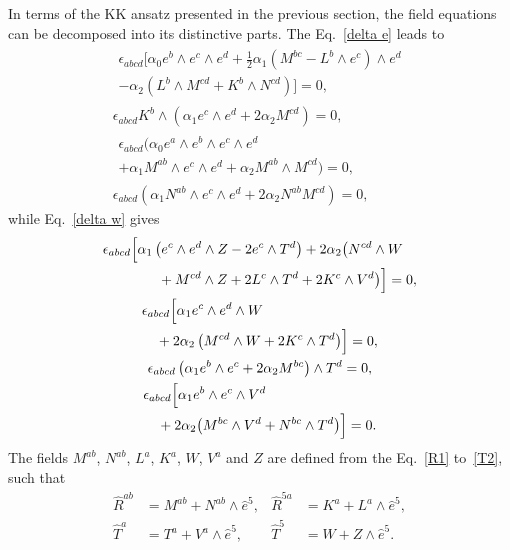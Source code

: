 \documentclass[aps,prd,12pt,superscriptaddress,showpacs,showkeys,longbibliography,reprint,nofootinbib]{revtex4-1}
\begin{document}
In terms of the KK ansatz presented in the previous section, the field equations can be decomposed into its distinctive parts. The Eq.~\eqref{delta e} leads to 
\setlength\multlinegap{0pt}
\begin{gather}
  \begin{multlined}
    \label{equation}
    \epsilon_{abcd}\Big[\alpha_0 e^b\wedge e^c\wedge e^d + \frac{1}{2}\alpha_1\left(M^{bc}-L^b\wedge e^c\right)\wedge e^d\\
      -\alpha_2\left(L^b\wedge M^{cd} + K^b\wedge N^{cd}\right)\Big]=0,
  \end{multlined}
  \\
  \epsilon_{abcd}K^b\wedge\left(\alpha_1e^c\wedge e^d + 2\alpha_2M^{cd}\right)=0,
  \\
  \begin{multlined}
    \epsilon_{abcd}\big(\alpha_0 e^a\wedge e^b\wedge e^c\wedge e^d \\
    +\alpha_1M^{ab}\wedge e^c\wedge e^d+\alpha_2M^{ab}\wedge M^{cd}\big)=0,
  \end{multlined}
  \\
  \epsilon_{abcd}\left(\alpha_1N^{ab}\wedge e^c\wedge e^d+2\alpha_2N^{ab}M^{cd}\right)=0,
\end{gather}
while Eq.~\eqref{delta w} gives
\setlength\multlinegap{0pt}
\begin{gather}
  \begin{multlined}
    \epsilon_{abcd}\Bigl[\alpha_1\left(e^c\wedge e^d\wedge Z-2e^c\wedge T^d\right)
      +2\alpha_2\big(N^{cd}\wedge W\\
      +M^{cd}\wedge Z+2L^c\wedge T^d
      +2K^c\wedge V^d\big)\Bigr]=0,
  \end{multlined}
  \\
  \begin{multlined}
    \epsilon_{abcd}\Bigl[\alpha_1e^c\wedge e^ d\wedge W \\
      + 2\alpha_2\left(M^{cd}\wedge W+2K^c\wedge T^d\right)\Bigr]=0,
  \end{multlined}
  \\
  \epsilon_{abcd}\left(\alpha_1e^b\wedge e^c+2\alpha_2M^{bc}\right)\wedge T^d=0,
  \\
  \begin{multlined}
    \epsilon_{abcd}\Bigl[\alpha_1e^b\wedge e^c\wedge V^d \\
      + 2\alpha_2\big(M^{bc}\wedge V^d+N^{bc}\wedge T^d\big)\Bigr]=0.
  \end{multlined}
\end{gather}
The fields $M^{ab}$, $N^{ab}$, $L^a$, $K^a$, $W$, $V^a$ and $Z$ are defined from the Eq.~\eqref{R1} to~\eqref{T2}, such that
\begin{equation}
  \begin{aligned}
    \hat{R}^{ab}&=M^{ab}+N^{ab}\wedge\hat{e}^5, & \hat{R}^{5a}&=K^a+L^a\wedge\hat{e}^5,\\
    \hat{T}^a&=T^a+V^a\wedge\hat{e}^5, & \hat{T}^5&=W+Z\wedge\hat{e}^5.
  \end{aligned}
\end{equation}
\end{document}
